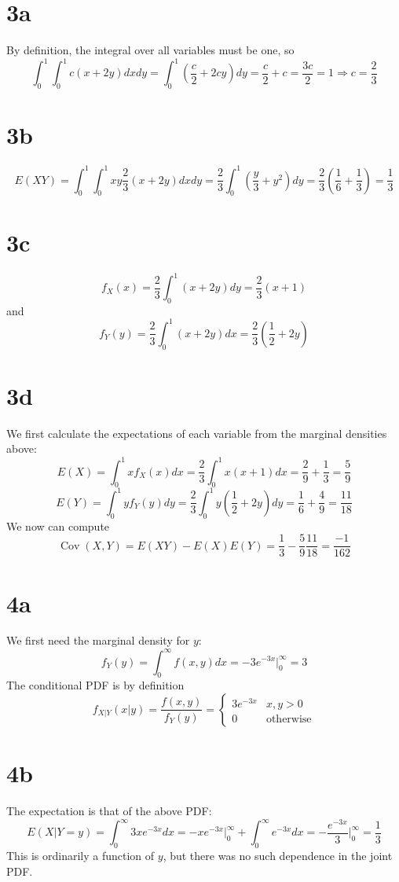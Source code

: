 \documentclass{article}
\DeclareMathOperator{\Cov}{Cov}
\begin{document}
\section*{3a}
By definition, the integral over all variables must be one, so
\[\int_0^1\int_0^1c(x+2y)dxdy=\int_0^1\left(\frac{c}{2}+2cy \right)dy=\frac{c}{2}+c=\frac{3c}{2}=1\Rightarrow c=\frac{2}{3}\]

\section*{3b}
\[E(XY)=\int_0^1\int_0^1xy\frac{2}{3}\left(x+2y  \right)dxdy=\frac{2}{3}\int_0^1\left( \frac{y}{3}+y^2 \right)dy=\frac{2}{3}\left( \frac{1}{6}+\frac{1}{3} \right)=\frac{1}{3}\]

\section*{3c}
\[f_X(x)=\frac{2}{3}\int_0^1\left( x+2y \right)dy=\frac{2}{3}\left( x+1 \right)\]
and
\[f_Y(y)=\frac{2}{3}\int_0^1\left( x+2y \right)dx=\frac{2}{3}\left( \frac{1}{2}+2y \right)\]

\section*{3d}
We first calculate the expectations of each variable from the marginal densities above:
\[E(X)=\int_0^1xf_X(x)dx=\frac{2}{3}\int_0^1x\left( x+1 \right)dx=\frac{2}{9}+\frac{1}{3}=\frac{5}{9}\]
\[E(Y)=\int_0^1yf_Y(y)dy=\frac{2}{3}\int_0^1y\left( \frac{1}{2}+2y \right)dy=\frac{1}{6}+\frac{4}{9}=\frac{11}{18}\]
We now can compute
\[\Cov(X, Y)=E(XY)-E(X)E(Y)=\frac{1}{3}-\frac{5}{9}\frac{11}{18}=\frac{-1}{162}\]


\section*{4a}
We first need the marginal density for $y$:
\[f_Y(y)=\int_0^\infty f(x,y)dx=-3e^{-3x}\bigg|_0^\infty=3\]
The conditional PDF is by definition
\[f_{X|Y}(x|y)=\frac{f(x,y)}{f_Y(y)}=\begin{cases}3e^{-3x} & x,y>0 \\ 0 & \textrm{otherwise}\end{cases}\]

\section*{4b}
The expectation is that of the above PDF:
\[E(X|Y=y)=\int_0^\infty 3xe^{-3x}dx=-xe^{-3x}\bigg|_0^\infty+\int_0^\infty e^{-3x}dx=-\frac{e^{-3x}}{3}\bigg|_0^\infty= \frac{1}{3}\]
This is ordinarily a function of $y$, but there was no such dependence in the joint PDF.
\end{document}
